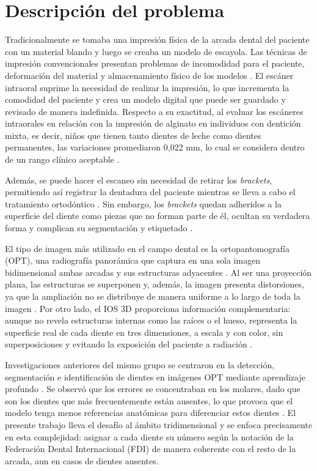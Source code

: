 \section{Descripción del problema}
\label{sec:descripcion-problema}

Tradicionalmente se tomaba una impresión física de la arcada dental del paciente con un material blando y luego se creaba un modelo de escayola. Las técnicas de impresión convencionales presentan problemas de incomodidad para el paciente, deformación del material y almacenamiento físico de los modelos \cite{leeClinicalApplicationIntraoral2024}. El escáner intraoral suprime la necesidad de realizar la impresión, lo que incrementa la comodidad del paciente y crea un modelo digital que puede ser guardado y revisado de manera indefinida. Respecto a su exactitud, al evaluar los escáneres intraorales en relación con la impresión de alginato en individuos con dentición mixta, es decir, niños que tienen tanto dientes de leche como dientes permanentes, las variaciones promediaron 0{,}022 mm, lo cual se considera dentro de un rango clínico aceptable \cite{leeClinicalApplicationIntraoral2024}.

Además, se puede hacer el escaneo sin necesidad de retirar los \textit{brackets}, permitiendo así registrar la dentadura del paciente mientras se lleva a cabo el tratamiento ortodóntico \cite{leeClinicalApplicationIntraoral2024}. Sin embargo, los \textit{brackets} quedan adheridos a la superficie del diente como piezas que no forman parte de él, ocultan su verdadera forma y complican su segmentación y etiquetado \cite{ben-hamadou3DTeethSeg223DTeeth2023}.

El tipo de imagen más utilizado en el campo dental es la ortopantomografía (OPT), una radiografía panorámica que captura en una sola imagen bidimensional ambas arcadas y sus estructuras adyacentes \cite{barcoDeteccionSegmentacion2025}. Al ser una proyección plana, las estructuras se superponen y, además, la imagen presenta distorsiones, ya que la ampliación no se distribuye de manera uniforme a lo largo de toda la imagen \cite{barcoDeteccionSegmentacion2025}. Por otro lado, el IOS 3D proporciona información complementaria: aunque no revela estructuras internas como las raíces o el hueso, representa la superficie real de cada diente en tres dimensiones, a escala y con color, sin superposiciones y evitando la exposición del paciente a radiación \cite{forrestForensicOdontologyDVI2019}. 

Investigaciones anteriores del mismo grupo se centraron en la detección, segmentación e identificación de dientes en imágenes OPT mediante aprendizaje profundo \cite{barcoDeteccionSegmentacion2025}. Se observó que los errores se concentraban en los molares, dado que son los dientes que más frecuentemente están ausentes, lo que provoca que el modelo tenga menos referencias anatómicas para diferenciar estos dientes \cite{barcoDeteccionSegmentacion2025}. El presente trabajo lleva el desafío al ámbito tridimensional y se enfoca precisamente en esta complejidad: asignar a cada diente su número según la notación de la Federación Dental Internacional (FDI) de manera coherente con el resto de la arcada, aun en casos de dientes ausentes.

